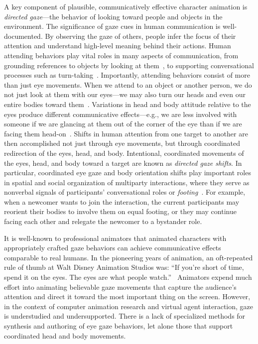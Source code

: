 A key component of plausible, communicatively effective character animation is \emph{directed gaze}---the behavior of looking toward people and objects in the environment.
The significance of gaze cues in human communication is well-documented. By observing the gaze of others, people infer the focus of their attention and understand high-level meaning behind their actions. Human attending behaviors play vital roles in many aspects of communication, from grounding references to objects by looking at them~\citep{hanna2007speakers,preissler2005role}, to supporting conversational processes such as turn-taking~\citep{wiemann1975turn}.
Importantly, attending behaviors consist of more than just eye movements. When we attend to an object or another person, we do not just look at them with our eyes---we may also turn our heads and even our entire bodies toward them~\citep{langton2000eyes}. Variations in head and body attitude relative to the eyes produce different communicative effects---e.g., we are less involved with someone if we are glancing at them out of the corner of the eye than if we are facing them head-on~\citep{kendon1990conducting,schegloff1998bodytorque}.
Shifts in human attention from one target to another are then accomplished not just through eye movements, but through coordinated redirection of the eyes, head, and body. Intentional, coordinated movements of the eyes, head, and body toward a target are known as \emph{directed gaze shifts}.
In particular, coordinated eye gaze and body orientation shifts play important roles in spatial and social organization of multiparty interactions, where they serve as nonverbal signals of participants' conversational roles or \emph{footing}~\citep{goffman1979footing}. For example, when a newcomer wants to join the interaction, the current participants may reorient their bodies to involve them on equal footing, or they may continue facing each other and relegate the newcomer to a bystander role.

It is well-known to professional animators that animated characters with appropriately crafted gaze behaviors can achieve communicative effects comparable to real humans. In the pioneering years of animation, an oft-repeated rule of thumb at Walt Disney Animation Studios was: ``If you're short of time, spend it on the eyes. The eyes are what people watch.''~\citep{williams2009animator} Animators expend much effort into animating believable gaze movements that capture the audience's attention and direct it toward the most important thing on the screen.
However, in the context of computer animation research and virtual agent interaction, gaze is understudied and undersupported. There is a lack of specialized methods for synthesis and authoring of eye gaze behaviors, let alone those that support coordinated head and body movements.

